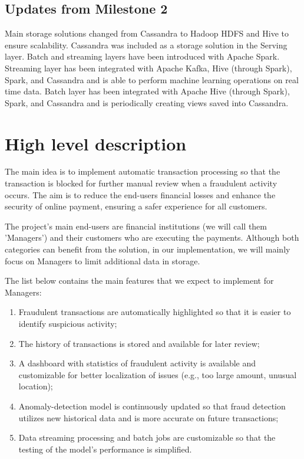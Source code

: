 \documentclass[12pt,a4paper, hidelinks]{article}
\begin{document}
\subsection*{Updates from Milestone 2}
Main storage solutions changed from Cassandra to Hadoop HDFS and Hive to ensure scalability. Cassandra was included as a storage solution in the Serving layer. Batch and streaming layers have been introduced with Apache Spark. Streaming layer has been integrated with Apache Kafka, Hive (through Spark), Spark, and Cassandra and is able to perform machine learning operations on real time data. Batch layer has been integrated with Apache Hive (through Spark), Spark, and Cassandra and is periodically creating views saved into Cassandra.



\section{High level description}

The main idea is to implement automatic transaction processing so that the transaction is blocked for further manual review when a fraudulent activity occurs. The aim is to reduce the end-users financial losses and enhance the security of online payment, ensuring a safer experience for all customers.

The project's main end-users are financial institutions (we will call them 'Managers') and their customers who are executing the payments. Although both categories can benefit from the solution, in our implementation, we will mainly focus on Managers to limit additional data in storage.

The list below contains the main features that we expect to implement for Managers:
\begin{enumerate}
    \item Fraudulent transactions are automatically highlighted so that it is easier to identify suspicious activity;
    \item The history of transactions is stored and available for later review;
    \item A dashboard with statistics of fraudulent activity is available and customizable for better localization of issues (e.g., too large amount, unusual location);
    \item Anomaly-detection model is continuously updated so that fraud detection utilizes new historical data and is more accurate on future transactions;
    \item Data streaming processing and batch jobs are customizable so that the testing of the model's performance is simplified.
\end{enumerate}
\end{document}
